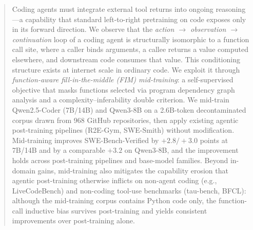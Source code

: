 \vspace{-2.5ex}

\begin{abstract}
Coding agents must integrate external tool returns into ongoing reasoning---a
capability that standard left-to-right pretraining on code exposes only in its
forward direction. We observe that the
\textit{action $\rightarrow$ observation $\rightarrow$ continuation} loop of a
coding agent is structurally isomorphic to a function call site, where a
caller binds arguments, a callee returns a value computed elsewhere, and
downstream code consumes that value. This conditioning structure exists at
internet scale in ordinary code. We exploit it through
\emph{function-aware fill-in-the-middle (FIM) mid-training}: a self-supervised
objective that masks functions selected via program dependency graph
analysis and a complexity--inferability double criterion. We mid-train
Qwen2.5-Coder (7B/14B) and Qwen3-8B on a 2.6B-token decontaminated corpus
drawn from 968 GitHub repositories, then apply existing agentic post-training
pipelines (R2E-Gym, SWE-Smith) without modification. Mid-training improves
SWE-Bench-Verified by $+2.8/+3.0$ points at 7B/14B and by a comparable
$+3.2$ on Qwen3-8B, and the improvement holds across post-training
pipelines and base-model families. Beyond in-domain gains, mid-training also mitigates
the capability erosion that agentic post-training otherwise inflicts on
non-agent coding (e.g., LiveCodeBench) and non-coding tool-use benchmarks
(tau-bench, BFCL): although the mid-training corpus contains Python code
only, the function-call inductive bias survives post-training and yields
consistent improvements over post-training alone.
\end{abstract}

\vspace{-1.5ex}
